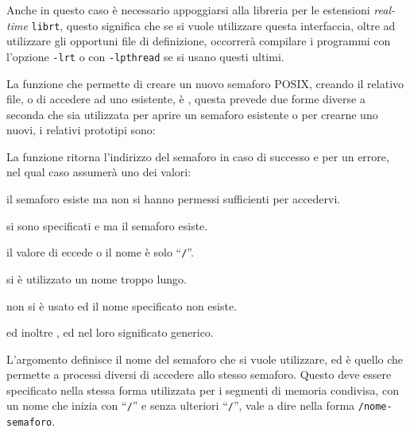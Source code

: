 Anche in questo caso è necessario appoggiarsi alla libreria per le estensioni
\textit{real-time} \texttt{librt}, questo significa che se si vuole utilizzare
questa interfaccia, oltre ad utilizzare gli opportuni file di definizione,
occorrerà compilare i programmi con l'opzione \texttt{-lrt} o con
\texttt{-lpthread} se si usano questi ultimi. 

La funzione che permette di creare un nuovo semaforo POSIX, creando il
relativo file, o di accedere ad uno esistente, è , questa
prevede due forme diverse a seconda che sia utilizzata per aprire un semaforo
esistente o per crearne uno nuovi, i relativi prototipi sono:

\begin{funcproto}{

}
{La funzione ritorna l'indirizzo del semaforo in caso di successo e
   per un errore, nel qual caso  assumerà uno
  dei valori:
  \begin{errlist}
    \item[\errcode{EACCES}] il semaforo esiste ma non si hanno permessi
      sufficienti per accedervi.
    \item[\errcode{EEXIST}] si sono specificati  e
       ma il semaforo esiste.
    \item[\errcode{EINVAL}] il valore di  eccede
       o il nome è solo ``\texttt{/}''.
    \item[\errcode{ENAMETOOLONG}] si è utilizzato un nome troppo lungo.
    \item[\errcode{ENOENT}] non si è usato  ed il nome
      specificato non esiste.
  \end{errlist}
  ed inoltre ,  ed  nel loro
  significato generico.

}
\end{funcproto}

L'argomento  definisce il nome del semaforo che si vuole
utilizzare, ed è quello che permette a processi diversi di accedere allo
stesso semaforo. Questo deve essere specificato nella stessa forma utilizzata
per i segmenti di memoria condivisa, con un nome che inizia con ``\texttt{/}''
e senza ulteriori ``\texttt{/}'', vale a dire nella forma
\texttt{/nome-semaforo}.

